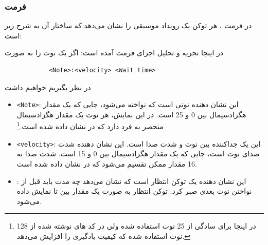 \subsubsection{فرمت }

در فرمت ، هر توکن یک رویداد موسیقی را نشان می‌دهد که
ساختار آن به شرح زیر است:

در اینجا تجزیه و تحلیل اجزای فرمت آمده است:
اگر یک نوت را به صورت
\begin{LTR}
      \begin{verbatim}
            <Note>:<velocity> <Wait time>
      \end{verbatim}
\end{LTR}
در نظر بگیریم خواهیم داشت

\begin{itemize}
      \item{\texttt{<Note>}:}
            این نشان دهنده نوتی است که نواخته می‌شود، جایی که  یک مقدار هگزادسیمال بین 0 و 25 است. در این نمایش، هر نوت یک مقدار هگزادسیمال منحصر به فرد دارد که در  نشان داده شده است.\footnote{در اینجا برای سادگی از 25 نوت استفاده شده ولی در کد های نوشته شده از 128 نوت استفاده شده که کیفیت یادگیری را افزایش می‌دهد.}
      \item{\texttt{<velocity>}:}
            این یک جداکننده بین نوت و شدت صدا است.
            این نشان دهنده شدت صدای نوت است، جایی که  یک مقدار هگزادسیمال بین 0 و 15 است. شدت صدا به 16 مقدار ممکن تقسیم می‌شود که در  نشان داده شده است.
      \item{:}
            این نشان دهنده یک توکن انتظار است که نشان می‌دهد چه مدت باید قبل از نواختن نوت بعدی صبر کرد. توکن انتظار به صورت یک مقدار بین  تا  نمایش داده می‌شود.
\end{itemize}

